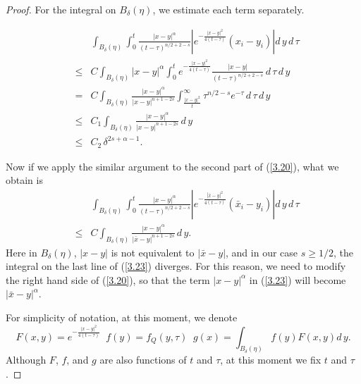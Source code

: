 \documentclass[12pt]{article}
\theoremstyle{remark}
\numberwithin{equation}{section}
\begin{document}
\begin{proof}
For the integral on $B_\delta (\eta)$, we estimate each term separately.

\begin{eqnarray}
& & \int_{B_\delta (\eta)} \int_0^t \frac{ |x-y|^\alpha }{(t-\tau)^{n/2+2-s}}  \left| e^{- \frac{|x-y|^2}{4(t-\tau)}} (x_i-y_i) \right|  d \, y \, d \, \tau   \nonumber \\
& \leq & C  \int_{B_\delta (\eta)} |x-y|^\alpha \int_0^t e^{-\frac{|x-y|^2}{4(t-\tau)}} \frac{|x-y|}{(t-\tau)^{n/2+2-s}} \, d \, \tau \, d\, y \nonumber \\
& = & C \int_{B_\delta (\eta)} \frac{|x-y|^{\alpha}}{|x-y|^{n+1-2s}} \int_{\frac{|x-y|^2}{t}} ^\infty \tau^{n/2-s} e^{-\tau}  \, d \, \tau \, d\, y \nonumber \\
& \leq & C_1 \int_{B_\delta (\eta)} \frac{|x-y|^{\alpha}}{|x-y|^{n+1-2s}} \, d\, y \nonumber \\
& \leq & C_2 \, \delta^{2s+\alpha-1}.
\label{3.22}
\end{eqnarray}

Now if we apply the similar argument to the second part of (\ref{3.20}), what we obtain is
\begin{eqnarray}
& & \int_{B_\delta (\eta)} \int_0^t \frac{ |x-y|^\alpha }{(t-\tau)^{n/2+2-s}}  \left| e^{- \frac{|\bar{x}-y|^2}{4(t-\tau)}} (\bar{x}_i-y_i) \right|  d \, y \, d \, \tau  \nonumber \\
& \leq & C \int_{B_\delta (\eta)} \frac{|x-y|^{\alpha}}{|\bar{x}-y|^{n+1-2s}} \, d\, y.
\label{3.23}
\end{eqnarray}
Here in $B_\delta (\eta)$, $|x-y|$ is not equivalent to $|\bar{x}-y|$, and in our case $s \geq 1/2$, the integral on the last line of (\ref{3.23}) diverges. For this reason, we need to modify the right hand side of (\ref{3.20}), so that the term $|x-y|^\alpha$ in (\ref{3.23}) will become $|\bar{x}-y|^\alpha$.

For simplicity of notation, at this moment, we denote
$$ F(x,y) = e^{-\frac{|x-y|^2}{4(t-\tau)}} \;\; f(y) = f_Q(y, \tau) \;\; g(x) = \int_{B_\delta (\eta)} f(y) F(x,y) d \, y.$$
Although $F$, $f$, and $g$ are also functions of $t$ and $\tau$, at this moment we fix $t$ and $\tau$.


\end{proof}
\end{document}
